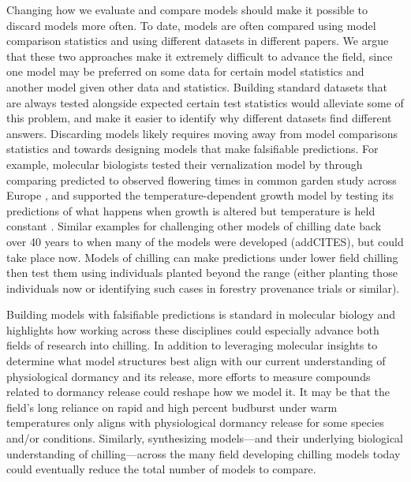 \documentclass[11pt]{article}
\begin{document}
Changing how we evaluate and compare models should make it possible to discard models more often. To date, models are often compared using model comparison statistics and using different datasets in different papers. We argue that these two approaches make it extremely difficult to advance the field, since one model may be preferred on some data for certain model statistics and another model given other data and statistics. Building standard datasets that are always tested alongside expected certain test statistics would alleviate some of this problem, and make it easier to identify why different datasets find different answers. Discarding models likely requires moving away from model comparisons statistics and towards designing models that make falsifiable predictions. For example, molecular biologists tested their vernalization model by through comparing predicted to observed flowering times in common garden study across Europe \citep[][]{Wilczek:2009oa}, and supported the temperature-dependent growth model by testing its predictions of what happens when growth is altered but temperature is held constant \citep{zhao2020temperature}. Similar examples for challenging other models of chilling date back over 40 years to when many of the models were developed (addCITES), but could take place now. Models of chilling can make predictions under lower field chilling then test them using individuals planted beyond the range (either planting those individuals now or identifying such cases in forestry provenance trials or similar). 

Building models with falsifiable predictions is standard in molecular biology and highlights how working across these disciplines could especially advance both fields of research into chilling. In addition to leveraging molecular insights to determine what model structures best align with our current understanding of physiological dormancy and its release, more efforts to measure compounds related to dormancy release could reshape how we model it. It may be that the field's long reliance on rapid and high percent budburst under warm temperatures only aligns with physiological dormancy release for some species and/or conditions. Similarly, synthesizing models---and their underlying biological understanding of chilling---across the many field developing chilling models today could eventually reduce the total number of models to compare. 
\end{document}
